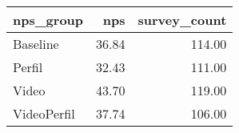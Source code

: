 \begin{tabular}{lrr}
  \hline
nps\_group & nps & survey\_count \\ 
  \hline
Baseline & 36.84 & 114.00 \\ 
  Perfil & 32.43 & 111.00 \\ 
  Video & 43.70 & 119.00 \\ 
  VideoPerfil & 37.74 & 106.00 \\ 
   \hline
\end{tabular}
